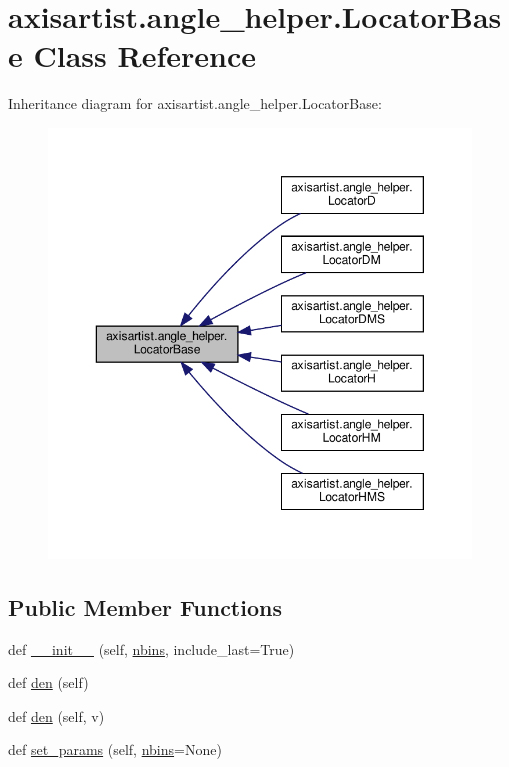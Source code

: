 \hypertarget{classaxisartist_1_1angle__helper_1_1LocatorBase}{}\section{axisartist.\+angle\+\_\+helper.\+Locator\+Base Class Reference}
\label{classaxisartist_1_1angle__helper_1_1LocatorBase}


Inheritance diagram for axisartist.\+angle\+\_\+helper.\+Locator\+Base\+:
\nopagebreak
\begin{figure}[H]
\begin{center}
\leavevmode
\includegraphics[width=350pt]{classaxisartist_1_1angle__helper_1_1LocatorBase__inherit__graph}
\end{center}
\end{figure}
\subsection*{Public Member Functions}
\begin{DoxyCompactItemize}
\item 
def \hyperlink{classaxisartist_1_1angle__helper_1_1LocatorBase_af802e7480e4264bde94c30c2630c95f3}{\+\_\+\+\_\+init\+\_\+\+\_\+} (self, \hyperlink{classaxisartist_1_1angle__helper_1_1LocatorBase_a195a74f763f1628601e498bd636ed5cd}{nbins}, include\+\_\+last=True)
\item 
def \hyperlink{classaxisartist_1_1angle__helper_1_1LocatorBase_a7fc462cfc919459c9b88eabd7ab8b5c6}{den} (self)
\item 
def \hyperlink{classaxisartist_1_1angle__helper_1_1LocatorBase_a67d0f4bcab47161bf3d299e2633fae0e}{den} (self, v)
\item 
def \hyperlink{classaxisartist_1_1angle__helper_1_1LocatorBase_a8b3bb025caa755322da7e5d9166aea6c}{set\+\_\+params} (self, \hyperlink{classaxisartist_1_1angle__helper_1_1LocatorBase_a195a74f763f1628601e498bd636ed5cd}{nbins}=None)
\end{DoxyCompactItemize}
